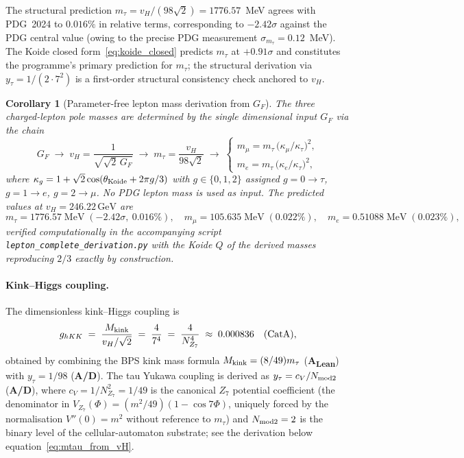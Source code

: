 \documentclass[11pt]{article}
\newcommand{\CatAL}{\textbf{A\textsubscript{Lean}}}
\newcommand{\CatAD}{\textbf{A/D}}
\newtheorem{corollary}[theorem]{Corollary}
\theoremstyle{remark}
\begin{document}
The structural prediction $m_\tau = v_H/(98\sqrt{2}) = 1776.57$~MeV agrees with PDG~2024 to $0.016\%$ in relative terms, corresponding to $-2.42\sigma$ against the PDG central value (owing to the precise PDG measurement $\sigma_{m_\tau} = 0.12$~MeV).  The Koide closed form~\eqref{eq:koide_closed} predicts $m_\tau$ at $+0.91\sigma$ and constitutes the programme's primary prediction for $m_\tau$; the structural derivation via $y_\tau = 1/(2\cdot 7^2)$ is a first-order structural consistency check anchored to $v_H$.

\begin{corollary}[Parameter-free lepton mass derivation from $G_F$]
\label{cor:lepton_from_GF}
The three charged-lepton pole masses are determined by the single dimensional input $G_F$ via the chain
\[
G_F \;\longrightarrow\; v_H = \frac{1}{\sqrt{\sqrt{2}\,G_F}}
\;\longrightarrow\;
m_\tau = \frac{v_H}{98\sqrt{2}}
\;\longrightarrow\;
\begin{cases}
m_\mu = m_\tau\,\bigl(\kappa_\mu/\kappa_\tau\bigr)^2, \\[2pt]
m_e   = m_\tau\,\bigl(\kappa_e/\kappa_\tau\bigr)^2,
\end{cases}
\]
where $\kappa_g = 1 + \sqrt{2}\cos(\theta_{\rm Koide} + 2\pi g/3)$ with $g\in\{0,1,2\}$ assigned $g=0\to\tau$, $g=1\to e$, $g=2\to\mu$.  No PDG lepton mass is used as input.  The predicted values at $v_H = 246.22\,\mathrm{GeV}$ are
\[
m_\tau = 1776.57\;\mathrm{MeV}\;(-2.42\sigma,\ 0.016\%),\quad
m_\mu  = 105.635\;\mathrm{MeV}\;(0.022\%),\quad
m_e    = 0.51088\;\mathrm{MeV}\;(0.023\%),
\]
verified computationally in the accompanying script \texttt{lepton\_complete\_derivation.py} with the Koide $Q$ of the derived masses reproducing $2/3$ exactly by construction.
\end{corollary}

\paragraph{Kink--Higgs coupling.}
The dimensionless kink--Higgs coupling is
\begin{equation}
g_{hKK} \;=\; \frac{M_{\rm kink}}{v_H/\sqrt{2}} \;=\; \frac{4}{7^4} \;=\; \frac{4}{N_{Z_7}^4} \;\approx\; 0.000836 \quad (\text{CatA}),
\label{eq:ghKK}
\end{equation}
obtained by combining the BPS kink mass formula $M_{\rm kink} = (8/49)m_\tau$ (\CatAL) with $y_\tau = 1/98$ (\CatAD).  The tau Yukawa coupling is derived as $y_\tau = c_V/N_{\rm mod2}$ (\CatAD), where $c_V = 1/N_{Z_7}^2 = 1/49$ is the canonical $Z_7$ potential coefficient (the denominator in $V_{Z_7}(\Phi) = (m^2/49)(1-\cos 7\Phi)$, uniquely forced by the normalisation $V''(0) = m^2$ without reference to $m_\tau$) and $N_{\rm mod2} = 2$ is the binary level of the cellular-automaton substrate; see the derivation below equation~\eqref{eq:mtau_from_vH}.
\end{document}
